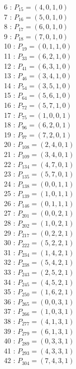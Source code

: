 \documentclass{article}
\begin{document}
{\begin{multicols}{3}
6 : $P_{15}=( 4, 0, 1, 0 )$\\
7 : $P_{16}=( 5, 0, 1, 0 )$\\
8 : $P_{17}=( 6, 0, 1, 0 )$\\
9 : $P_{18}=( 7, 0, 1, 0 )$\\
10 : $P_{19}=( 0, 1, 1, 0 )$\\
11 : $P_{33}=( 6, 2, 1, 0 )$\\
12 : $P_{41}=( 6, 3, 1, 0 )$\\
13 : $P_{46}=( 3, 4, 1, 0 )$\\
14 : $P_{54}=( 3, 5, 1, 0 )$\\
15 : $P_{64}=( 5, 6, 1, 0 )$\\
16 : $P_{72}=( 5, 7, 1, 0 )$\\
17 : $P_{75}=( 1, 0, 0, 1 )$\\
18 : $P_{96}=( 6, 2, 0, 1 )$\\
19 : $P_{97}=( 7, 2, 0, 1 )$\\
20 : $P_{108}=( 2, 4, 0, 1 )$\\
21 : $P_{109}=( 3, 4, 0, 1 )$\\
22 : $P_{134}=( 4, 7, 0, 1 )$\\
23 : $P_{135}=( 5, 7, 0, 1 )$\\
24 : $P_{138}=( 0, 0, 1, 1 )$\\
25 : $P_{139}=( 1, 0, 1, 1 )$\\
26 : $P_{146}=( 0, 1, 1, 1 )$\\
27 : $P_{201}=( 0, 0, 2, 1 )$\\
28 : $P_{202}=( 1, 0, 2, 1 )$\\
29 : $P_{217}=( 0, 2, 2, 1 )$\\
30 : $P_{222}=( 5, 2, 2, 1 )$\\
31 : $P_{234}=( 1, 4, 2, 1 )$\\
32 : $P_{238}=( 5, 4, 2, 1 )$\\
33 : $P_{243}=( 2, 5, 2, 1 )$\\
34 : $P_{245}=( 4, 5, 2, 1 )$\\
35 : $P_{250}=( 1, 6, 2, 1 )$\\
36 : $P_{265}=( 0, 0, 3, 1 )$\\
37 : $P_{266}=( 1, 0, 3, 1 )$\\
38 : $P_{277}=( 4, 1, 3, 1 )$\\
39 : $P_{279}=( 6, 1, 3, 1 )$\\
40 : $P_{289}=( 0, 3, 3, 1 )$\\
41 : $P_{293}=( 4, 3, 3, 1 )$\\
42 : $P_{304}=( 7, 4, 3, 1 )$\\

\end{multicols}}
\end{document}
